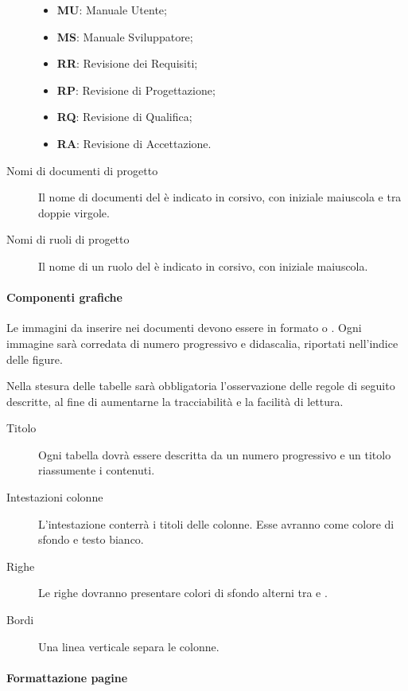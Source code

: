 \documentclass[a4paper, titlepage]{article}
\begin{document}
\begin{description}
\begin{itemize}
		\item \textbf{MU}: Manuale Utente;
		\item \textbf{MS}: Manuale Sviluppatore;
		\item \textbf{RR}: Revisione dei Requisiti;
		\item \textbf{RP}: Revisione di Progettazione;
		\item \textbf{RQ}: Revisione di Qualifica;
		\item \textbf{RA}: Revisione di Accettazione.
	\end{itemize}
	\item[Nomi di documenti di progetto]
	Il nome di documenti del  è indicato in corsivo, con iniziale maiuscola e tra doppie virgole.
	\item[Nomi di ruoli di progetto]
	Il nome di un ruolo del  è indicato in corsivo, con iniziale maiuscola.
\end{description}

\paragraph{Componenti grafiche}

Le immagini da inserire nei documenti devono essere in formato  o . Ogni immagine sarà corredata di numero progressivo e didascalia, riportati nell'indice delle figure.

Nella stesura delle tabelle sarà obbligatoria l'osservazione delle regole di seguito descritte, al fine di aumentarne la tracciabilità e la facilità di lettura.
\begin{description}
	\item[Titolo] 
	Ogni tabella dovrà essere descritta da un numero progressivo e un titolo riassumente i contenuti.
	\item[Intestazioni colonne] 
	L'intestazione conterrà i titoli delle colonne. Esse avranno \crule[I] come colore di sfondo e testo bianco.
	\item[Righe] 
	Le righe dovranno presentare colori di sfondo alterni tra \crule[P] e \crule[D].
	\item[Bordi] 
	Una linea verticale \crule[I] separa le colonne.
\end{description}

\paragraph{Formattazione pagine}
\end{document}
